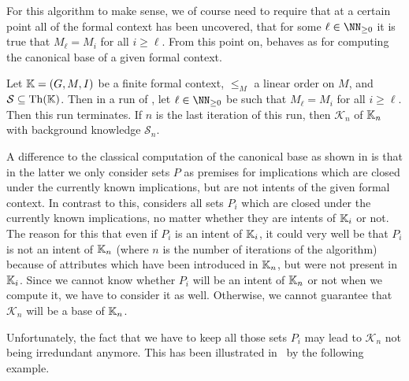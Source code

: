 For this algorithm to make sense, we of course need to require that at a certain point all
of the formal context has been uncovered, \ie that for some $\ell \in \NN_{\geq 0}$ it is
true that $M_{\ell} = M_{i}$ for all $i \geq \ell$.  From this point on,
 behaves as  for
computing the canonical base of a given formal context.

\begin{Theorem}
  \label{thm:base-with-growing-set-of-attributes}
  Let ${\mathbb{K}} = (G, M, I)$ be a finite formal context, $\leq_{M}$ a linear order on $M$,
  and $\mathcal{S} \subseteq \operatorname{Th}({\mathbb{K}})$.  Then in a run of
  , let $\ell \in \NN_{\ge 0}$ be such that
  $M_{\ell} = M_{i}$ for all $i \geq \ell$.  Then this run terminates.  If $n$ is the last
  iteration of this run, then $\mathcal{K}_{n}$ of ${\mathbb{K}}_{n}$ with background knowledge
  $\mathcal{S}_{n}$.
\end{Theorem}

A difference to the classical computation of the canonical base as shown in
 is that in the latter we only consider sets $P$ as premises for
implications which are closed under the currently known implications, but are not intents
of the given formal context.  In contrast to this,
 considers all sets $P_{i}$ which are closed
under the currently known implications, no matter whether they are intents of ${\mathbb{K}}_{i}$
or not.  The reason for this that even if $P_{i}$ is an intent of ${\mathbb{K}}_{i}$, it could
very well be that $P_{i}$ is not an intent of ${\mathbb{K}}_{n}$ (where $n$ is the number of
iterations of the algorithm) because of attributes which have been introduced in ${\mathbb{K}}_{n}$, but were not present in ${\mathbb{K}}_{i}$.  Since we cannot know whether $P_{i}$ will
be an intent of ${\mathbb{K}}_{n}$ or not when we compute it, we have to consider it as well.
Otherwise, we cannot guarantee that $\mathcal{K}_{n}$ will be a base of ${\mathbb{K}}_{n}$.

Unfortunately, the fact that we have to keep all those sets $P_{i}$ may lead to
$\mathcal{K}_{n}$ not being irredundant anymore.  This has been illustrated
in~\cite{Diss-Felix} by the following example.

